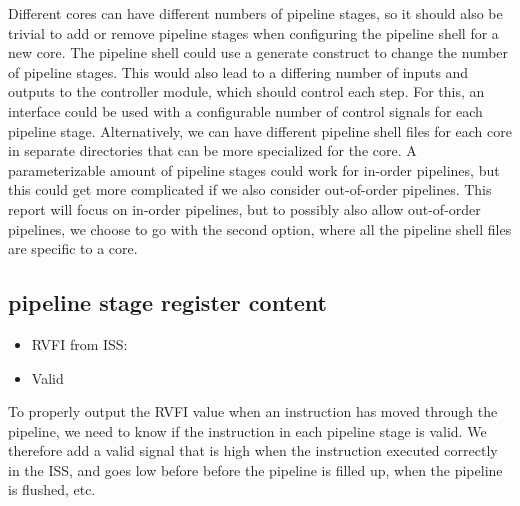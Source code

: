 Different cores can have different numbers of pipeline stages, so it should also be trivial to add or remove pipeline stages when configuring the pipeline shell for a new core. The pipeline shell could use a generate construct to change the number of pipeline stages. This would also lead to a differing number of inputs and outputs to the controller module, which should control each step. For this, an interface could be used with a configurable number of control signals for each pipeline stage. Alternatively, we can have different pipeline shell files for each core in separate directories that can be more specialized for the core. A parameterizable amount of pipeline stages could work for in-order pipelines, but this could get more complicated if we also consider out-of-order pipelines. This report will focus on in-order pipelines, but to possibly also allow out-of-order pipelines, we choose to go with the second option, where all the pipeline shell files are specific to a core.


%
%
%
%
%
%

\subsection{pipeline stage register content}

\begin{itemize}
    \item RVFI from ISS: \textbf{}
    \item Valid
\end{itemize}

To properly output the RVFI value when an instruction has moved through the pipeline, we need to know if the instruction in each pipeline stage is valid.
We therefore add a valid signal that is high when the instruction executed correctly in the ISS, and goes low before before the pipeline is filled up, when the pipeline is flushed, etc.

